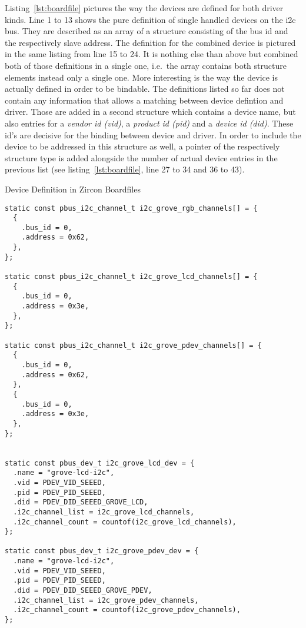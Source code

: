 Listing~\ref{lst:boardfile} pictures the way the devices are defined for both driver kinds.
Line 1 to 13 shows the pure definition of single handled devices on the \ac{i2c} bus.
They are described as an array of a structure consisting of the bus id and the respectively slave address.
The definition for the combined device is pictured in the same listing from line 15 to 24. 
It is nothing else than above but combined both of those definitions in a single one, i.e.\ the array contains both structure elements instead only a single one.
More interesting is the way the device is actually defined in order to be bindable.
The definitions listed so far does not contain any information that allows a matching between device defintion and driver.
Those are added in a second structure which contains a device name, but also entries for a \textit{vendor id (vid)}, a \textit{product id (pid)} and a \textit{device id (did)}.
These id's are decisive for the binding between device and driver.
In order to include the device to be addressed in this structure as well, a pointer of the respectively structure type is added alongside the number of actual device entries in the previous list (see listing~\ref{lst:boardfile}, line 27 to 34 and 36 to 43).

\begin{listing} [H]
\caption{Device Definition in Zircon Boardfiles}
\label{lst:boardfile}
\begin{verbatim}
static const pbus_i2c_channel_t i2c_grove_rgb_channels[] = {
  {
    .bus_id = 0,
    .address = 0x62,
  },
};

static const pbus_i2c_channel_t i2c_grove_lcd_channels[] = {
  {
    .bus_id = 0,
    .address = 0x3e,
  },
}; 

static const pbus_i2c_channel_t i2c_grove_pdev_channels[] = {
  {
    .bus_id = 0,
    .address = 0x62,
  },
  {
    .bus_id = 0,
    .address = 0x3e,
  },
};


static const pbus_dev_t i2c_grove_lcd_dev = {
  .name = "grove-lcd-i2c",
  .vid = PDEV_VID_SEEED,              
  .pid = PDEV_PID_SEEED,              
  .did = PDEV_DID_SEEED_GROVE_LCD,    
  .i2c_channel_list = i2c_grove_lcd_channels,
  .i2c_channel_count = countof(i2c_grove_lcd_channels),
}; 

static const pbus_dev_t i2c_grove_pdev_dev = {
  .name = "grove-lcd-i2c",
  .vid = PDEV_VID_SEEED,              
  .pid = PDEV_PID_SEEED,              
  .did = PDEV_DID_SEEED_GROVE_PDEV,  
  .i2c_channel_list = i2c_grove_pdev_channels,
  .i2c_channel_count = countof(i2c_grove_pdev_channels),
};
\end{verbatim}
\end{listing}

